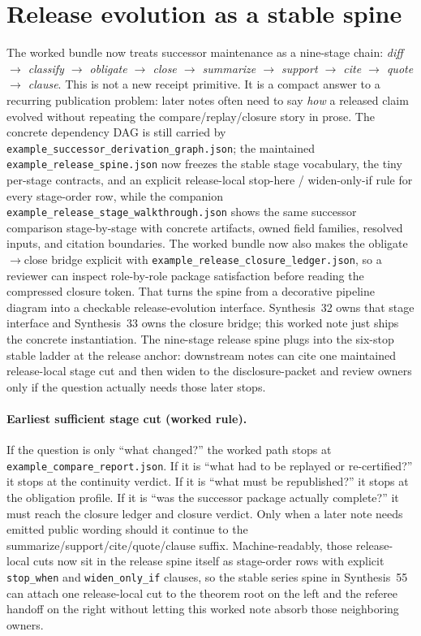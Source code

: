 \documentclass[11pt]{article}
\begin{document}
\section{Release evolution as a stable spine}
The worked bundle now treats successor maintenance as a nine-stage chain:
\emph{diff $\to$ classify $\to$ obligate $\to$ close $\to$ summarize $\to$ support $\to$ cite $\to$ quote $\to$ clause}.
This is not a new receipt primitive.
It is a compact answer to a recurring publication problem: later notes often need to say \emph{how} a released claim evolved without repeating the compare/replay/closure story in prose.
The concrete dependency DAG is still carried by \texttt{example\_successor\_derivation\_graph.json}; the maintained \texttt{example\_release\_spine.json} now freezes the stable stage vocabulary, the tiny per-stage contracts, and an explicit release-local stop-here / widen-only-if rule for every stage-order row, while the companion \texttt{example\_release\_stage\_walkthrough.json} shows the same successor comparison stage-by-stage with concrete artifacts, owned field families, resolved inputs, and citation boundaries. The worked bundle now also makes the obligate$\to$close bridge explicit with \texttt{example\_release\_closure\_ledger.json}, so a reviewer can inspect role-by-role package satisfaction before reading the compressed closure token. That turns the spine from a decorative pipeline diagram into a checkable release-evolution interface. Synthesis~32 owns that stage interface and Synthesis~33 owns the closure bridge; this worked note just ships the concrete instantiation.\cite{series:releasespine,series:releaseclosure} The nine-stage release spine plugs into the six-stop stable ladder at the release anchor: downstream notes can cite one maintained release-local stage cut and then widen to the disclosure-packet and review owners only if the question actually needs those later stops.

\paragraph{Earliest sufficient stage cut (worked rule).}
If the question is only ``what changed?'' the worked path stops at \texttt{example\_compare\_report.json}. If it is ``what had to be replayed or re-certified?'' it stops at the continuity verdict. If it is ``what must be republished?'' it stops at the obligation profile. If it is ``was the successor package actually complete?'' it must reach the closure ledger and closure verdict. Only when a later note needs emitted public wording should it continue to the summarize/support/cite/quote/clause suffix. Machine-readably, those release-local cuts now sit in the release spine itself as stage-order rows with explicit \texttt{stop\_when} and \texttt{widen\_only\_if} clauses, so the stable series spine in Synthesis~55 can attach one release-local cut to the theorem root on the left and the referee handoff on the right without letting this worked note absorb those neighboring owners.\cite{series:releasespine,series:seriesspines}
\end{document}
